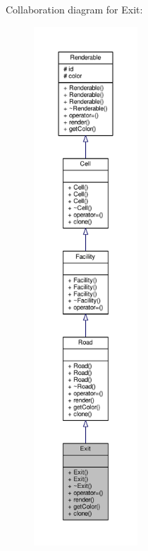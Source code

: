 Collaboration diagram for Exit\+:
\nopagebreak
\begin{figure}[H]
\begin{center}
\leavevmode
\includegraphics[height=550pt]{classExit__coll__graph}
\end{center}
\end{figure}
